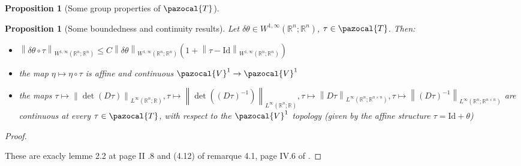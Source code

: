 \documentclass[english,a4paper,10pt,oneside]{scrbook}	%
\theoremstyle{break}
\newtheorem{prop}[equation]{Proposition}
\newenvironment{mproof}[1][\proofname]{%
  \begin{proof}[#1]$ $\par\nobreak\ignorespaces
}{%
  \end{proof}
}
\renewcommand*{\proofname}{Proof}
\theoremstyle{remark}
\newcommand{\mR}{\mathbb{R}}
\newcommand{\cV}{\pazocal{V}}
\newcommand{\ds}{\displaystyle}
\newcommand{\norm}[1]{\left\lVert#1\right\rVert}
\newcommand{\cT}{\pazocal{T}}
\newcommand{\id}{\text{Id}}
\newcommand{\te}{\theta}
\newcommand{\Te}{\Theta}
\begin{document}
\begin{appendices}
\begin{prop}[Some group properties of $\cT$]
\end{prop}
%
%
%
%
%
%


\begin{prop}[Some boundedness and continuity results]
\label{prop:22416}
Let $\delta \te \in W^{1,\infty}(\mR^n;\mR^n)$, $\tau \in \cT$. Then:
\begin{itemize}
\item $\ds \norm{\delta \te \circ \tau}_{ W^{1,\infty}(\mR^n;\mR^n)}\leq  C\norm{\delta \te}_{W^{1,\infty}(\mR^n;\mR^n)} (1+\norm{\tau -\id}_{ W^{1,\infty}(\mR^n;\mR^n)})$
\item the map $\eta \mapsto \eta \circ \tau$ is affine and continuous $\cV^1\rightarrow \cV^1$
\item the maps $\tau \mapsto \norm{\det(D\tau)}_{L^\infty(\mR^n;\mR)}, \tau \mapsto  \norm{\det((D\tau)^{-1})}_{L^\infty(\mR^n;\mR)},\tau  \mapsto \norm{D\tau}_{L^\infty(\mR^n;\mR^{n\times n})}, \tau \mapsto \norm{(D\tau)^{-1}}_{L^\infty(\mR^n;\mR^{n\times n})}$ are continuous at every $\tau \in \cT$, with respect to the $\cV^1$ topology (given by the affine structure $\tau = \id + \te$)
\end{itemize}
\end{prop}
\begin{mproof}
These are exacly lemme 2.2 at page II .8 and (4.12) of remarque 4.1, page IV.6 of \cite{murat}. 
\end{mproof}


\end{appendices}
\end{document}

